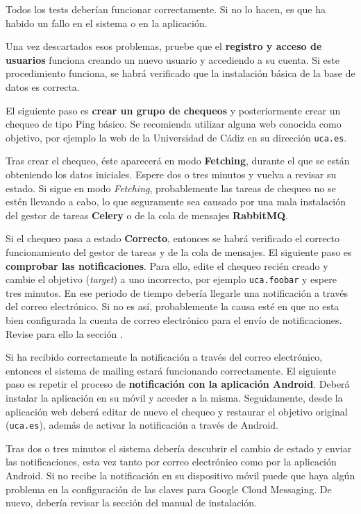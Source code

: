 Todos los tests deberían funcionar correctamente. Si no lo hacen, es que ha
habido un fallo en el sistema o en la aplicación.

Una vez descartados esos problemas, pruebe que el \textbf{registro y acceso de
  usuarios} funciona creando un nuevo usuario y accediendo a su cuenta. Si este
procedimiento funciona, se habrá verificado que la instalación básica de la base
de datos es correcta.

El siguiente paso es \textbf{crear un grupo de chequeos} y posteriormente crear
un chequeo de tipo Ping básico. Se recomienda utilizar alguna web conocida como
objetivo, por ejemplo la web de la Universidad de Cádiz en su dirección
\texttt{uca.es}.

Tras crear el chequeo, éste aparecerá en modo \textbf{Fetching}, durante el
que se están obteniendo los datos iniciales. Espere dos o tres minutos y vuelva
a revisar su estado. Si sigue en modo \textit{Fetching}, probablemente las
tareas de chequeo no se estén llevando a cabo, lo que seguramente sea causado
por una mala instalación del gestor de tareas \textbf{Celery} o de la cola de
mensajes \textbf{RabbitMQ}. 

Si el chequeo pasa a estado \textbf{Correcto}, entonces se habrá verificado el
correcto funcionamiento del gestor de tareas y de la cola de mensajes. El
siguiente paso es \textbf{comprobar las notificaciones}. Para ello, edite el
chequeo recién creado y cambie el objetivo (\textit{target}) a uno incorrecto,
por ejemplo \texttt{uca.foobar} y espere tres minutos. En ese periodo de tiempo
debería llegarle una notificación a través del correo electrónico. Si no es así,
probablemente la causa esté en que no esta bien configurada la cuenta de correo
electrónico para el envío de notificaciones. Revise para ello la sección
\textit{}.

Si ha recibido correctamente la notificación a través del correo electrónico,
entonces el sistema de mailing estará funcionando correctamente. El siguiente
paso es repetir el proceso de \textbf{notificación con la aplicación
  Android}. Deberá instalar la aplicación en su móvil y acceder a la
misma. Seguidamente, desde la aplicación web deberá editar de nuevo el chequeo y
restaurar el objetivo original (\texttt{uca.es}), además de activar la
notificación a través de Android.

Tras dos o tres minutos el sistema debería descubrir el cambio de estado y
enviar las notificaciones, esta vez tanto por correo electrónico como por la
aplicación Android. Si no recibe la notificación en su dispositivo móvil puede
que haya algún problema en la configuración de las claves para Google Cloud
Messaging. De nuevo, debería revisar la sección
\textit{} del manual de instalación.

